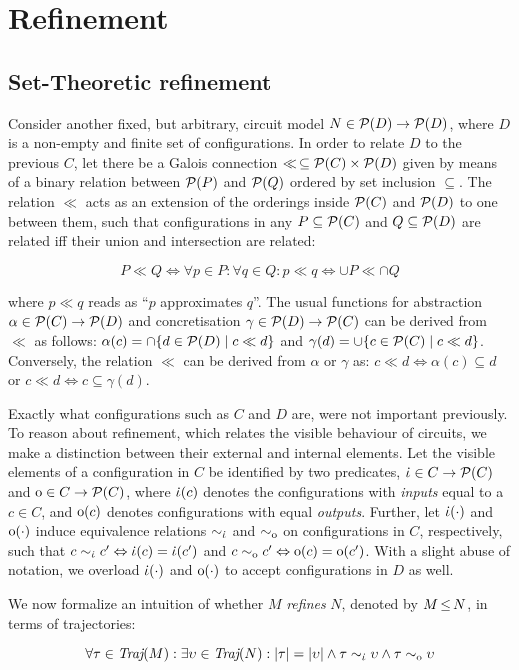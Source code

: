 \section{Refinement}

\subsection{Set-Theoretic refinement}

Consider another fixed, but arbitrary, circuit model $N \in \mathcal{P}(D) \rightarrow \mathcal{P}(D)$, where $D$ is a non-empty and finite set of configurations. In order to relate $D$ to the previous $C$, let there be a Galois connection $\ll \, \subseteq \mathcal{P}(C) \times \mathcal{P}(D)$ given by means of a binary relation between $\mathcal{P}(P)$ and $\mathcal{P}(Q)$ ordered by set inclusion $\subseteq$. The relation $\ll$ acts as an extension of the orderings inside $\mathcal{P}(C)$ and $\mathcal{P}(D)$ to one between them, such that configurations in any $P \subseteq \mathcal{P}(C)$ and $Q \subseteq \mathcal{P}(D)$ are related iff their union and intersection are related:

\begin{equation*}
P \ll Q \iff \forall p \in P : \forall q \in Q : p \ll q \iff \cup P \ll \cap Q
\end{equation*}

\noindent where $p \ll q$ reads as ``$p$ approximates $q$''. The usual functions for abstraction $\alpha \in \mathcal{P}(C) \rightarrow \mathcal{P}(D)$ and concretisation $\gamma \in \mathcal{P}(D) \rightarrow \mathcal{P}(C)$ can be derived from $\ll$ as follows: $\alpha(c) = \cap \{ d \in \mathcal{P}(D) \mid c \ll d \}$ and $\gamma(d) = \cup \{ c \in \mathcal{P}(C) \mid c \ll d \}$. Conversely, the relation $\ll$ can be derived from $\alpha$ or $\gamma$ as: $c \ll d \iff \alpha(c) \subseteq d$ or $c \ll d \iff c \subseteq \gamma(d)$. 

Exactly what configurations such as $C$ and $D$ are, were not important previously. To reason about refinement, which relates the visible behaviour of circuits, we make a distinction between their external and internal elements. Let the visible elements of a configuration in $C$ be identified by two predicates, $\dot{\iota} \in C \rightarrow \mathcal{P}(C)$ and $\mathrm{o} \in C \rightarrow \mathcal{P}(C)$, where $\dot{\iota}(c)$ denotes the configurations with \textit{inputs} equal to a $c \in C$, and $\mathrm{o}(c)$ denotes configurations with equal \textit{outputs}. Further, let $\dot{\iota}(\cdot)$ and $\mathrm{o}(\cdot)$ induce equivalence relations $\sim_{\dot{\iota}}$ and $\sim_{\mathrm{o}}$ on configurations in $C$, respectively, such that $c \sim_{\dot{\iota}} c' \Leftrightarrow \dot{\iota}(c) = \dot{\iota}(c')$ and $c \sim_{\mathrm{o}} c' \Leftrightarrow \mathrm{o}(c) = \mathrm{o}(c')$. With a slight abuse of notation, we overload $\dot{\iota}(\cdot)$ and $\mathrm{o}(\cdot)$ to accept configurations in $D$ as well.

We now formalize an intuition of whether $M$ \textit{refines} $N$, denoted by $M \operatorname{\leq} N$, in terms of trajectories:

\begin{equation*}
\forall \tau \in \operatorname{\textit{Traj}}(M) : \exists \upsilon \in \operatorname{\textit{Traj}}(N) : | \tau | = | \upsilon | \wedge \tau \sim_{\dot{\iota}} \upsilon \wedge \tau \sim_{\mathrm{o}} \upsilon
\end{equation*}
